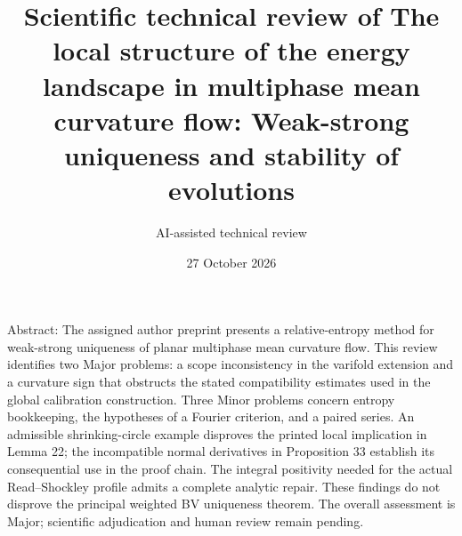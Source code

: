 \documentclass[10pt]{article}
\title{Scientific technical review of
The local structure of the energy landscape in multiphase mean curvature flow:
Weak-strong uniqueness and stability of evolutions}
\author{AI-assisted technical review}
\date{27 October 2026}
\begin{document}
\maketitle
Abstract: The assigned author preprint presents a relative-entropy method for weak-strong uniqueness of planar multiphase mean curvature flow. This review identifies two Major problems: a scope inconsistency in the varifold extension and a curvature sign that obstructs the stated compatibility estimates used in the global calibration construction. Three Minor problems concern entropy bookkeeping, the hypotheses of a Fourier criterion, and a paired series. An admissible shrinking-circle example disproves the printed local implication in Lemma 22; the incompatible normal derivatives in Proposition 33 establish its consequential use in the proof chain. The integral positivity needed for the actual Read–Shockley profile admits a complete analytic repair. These findings do not disprove the principal weighted BV uniqueness theorem. The overall assessment is Major; scientific adjudication and human review remain pending.\par
\end{document}
